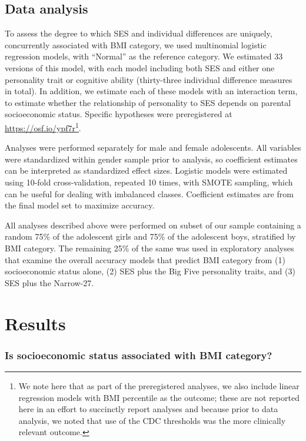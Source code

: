 \documentclass[man]{apa6}
\begin{document}
\hypertarget{data-analysis}{%
\subsection{Data analysis}\label{data-analysis}}

To assess the degree to which SES and individual differences are uniquely, concurrently associated with BMI category, we used multinomial logistic regression models, with \enquote{Normal} as the reference category. We estimated 33 versions of this model, with each model including both SES and either one personality trait or cognitive ability (thirty-three individual difference measures in total). In addition, we estimate each of these models with an interaction term, to estimate whether the relationship of personality to SES depends on parental socioeconomic status. Specific hypotheses were preregistered at \url{https://osf.io/ypf7r}\footnote{We note here that as part of the preregistered analyses, we also include linear regression models with BMI percentile as the outcome; these are not reported here in an effort to succinctly report analyses and because prior to data analysis, we noted that use of the CDC thresholds was the more clinically relevant outcome.}.

Analyses were performed separately for male and female adolescents. All variables were standardized within gender sample prior to analysis, so coefficient estimates can be interpreted as standardized effect sizes. Logistic models were estimated using 10-fold cross-validation, repeated 10 times, with SMOTE sampling, which can be useful for dealing with imbalanced classes. Coefficient estimates are from the final model set to maximize accuracy.

All analyses described above were performed on subset of our sample containing a random 75\% of the adolescent girls and 75\% of the adolescent boys, stratified by BMI category. The remaining 25\% of the same was used in exploratory analyses that examine the overall accuracy models that predict BMI category from (1) socioeconomic status alone, (2) SES plus the Big Five personality traits, and (3) SES plus the Narrow-27.

\hypertarget{results}{%
\section{Results}\label{results}}

\hypertarget{is-socioeconomic-status-associated-with-bmi-category}{%
\subsubsection{Is socioeconomic status associated with BMI category?}\label{is-socioeconomic-status-associated-with-bmi-category}}
\end{document}
